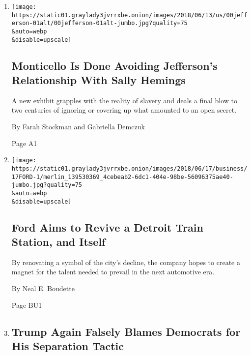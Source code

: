 \begin{enumerate}
\def\labelenumi{\arabic{enumi}.}
\item
  \href{/2018/06/16/us/sally-hemings-exhibit-monticello.html}{}

  \texttt{[image: https://static01.graylady3jvrrxbe.onion/images/2018/06/13/us/00jefferson-01alt/00jefferson-01alt-jumbo.jpg?quality=75\\\&auto=webp\\\&disable=upscale]}

  \hypertarget{monticello-is-done-avoiding-jeffersons-relationship-with-sally-hemings}{%
  \subsection{Monticello Is Done Avoiding Jefferson's Relationship With
  Sally
  Hemings}\label{monticello-is-done-avoiding-jeffersons-relationship-with-sally-hemings}}

  A new exhibit grapples with the reality of slavery and deals a final
  blow to two centuries of ignoring or covering up what amounted to an
  open secret.

  By Farah Stockman and Gabriella Demczuk

  Page A1
\item
  \href{/2018/06/17/business/ford-detroit-station.html}{}

  \texttt{[image: https://static01.graylady3jvrrxbe.onion/images/2018/06/17/business/17FORD-1/merlin\_139530369\_4cebeab2-6dc1-404e-98be-56096375ae40-jumbo.jpg?quality=75\\\&auto=webp\\\&disable=upscale]}

  \hypertarget{ford-aims-to-revive-a-detroit-train-station-and-itself}{%
  \subsection{Ford Aims to Revive a Detroit Train Station, and
  Itself}\label{ford-aims-to-revive-a-detroit-train-station-and-itself}}

  By renovating a symbol of the city's decline, the company hopes to
  create a magnet for the talent needed to prevail in the next
  automotive era.

  By Neal E. Boudette

  Page BU1
\item
  \href{/2018/06/16/us/politics/trump-democrats-separation-policy.html}{}

  \hypertarget{trump-again-falsely-blames-democrats-for-his-separation-tactic}{%
  \subsection{Trump Again Falsely Blames Democrats for His Separation
  Tactic}\label{trump-again-falsely-blames-democrats-for-his-separation-tactic}}


\end{enumerate}
